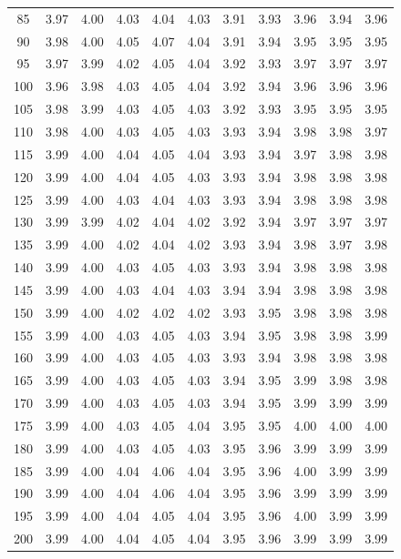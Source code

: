 \documentclass[preprint,12pt]{elsarticle}
\begin{document}
\begin{table}[ht]
\begin{tabular}{c|ccccc|ccccc}
  85 & 3.97 & 4.00 & 4.03 & 4.04 & 4.03 & 3.91 & 3.93 & 3.96 & 3.94 & 3.96 \\ 
  90 & 3.98 & 4.00 & 4.05 & 4.07 & 4.04 & 3.91 & 3.94 & 3.95 & 3.95 & 3.95 \\ 
  95 & 3.97 & 3.99 & 4.02 & 4.05 & 4.04 & 3.92 & 3.93 & 3.97 & 3.97 & 3.97 \\ 
  100 & 3.96 & 3.98 & 4.03 & 4.05 & 4.04 & 3.92 & 3.94 & 3.96 & 3.96 & 3.96 \\ 
  105 & 3.98 & 3.99 & 4.03 & 4.05 & 4.03 & 3.92 & 3.93 & 3.95 & 3.95 & 3.95 \\ 
  110 & 3.98 & 4.00 & 4.03 & 4.05 & 4.03 & 3.93 & 3.94 & 3.98 & 3.98 & 3.97 \\ 
  115 & 3.99 & 4.00 & 4.04 & 4.05 & 4.04 & 3.93 & 3.94 & 3.97 & 3.98 & 3.98 \\ 
  120 & 3.99 & 4.00 & 4.04 & 4.05 & 4.03 & 3.93 & 3.94 & 3.98 & 3.98 & 3.98 \\ 
  125 & 3.99 & 4.00 & 4.03 & 4.04 & 4.03 & 3.93 & 3.94 & 3.98 & 3.98 & 3.98 \\ 
  130 & 3.99 & 3.99 & 4.02 & 4.04 & 4.02 & 3.92 & 3.94 & 3.97 & 3.97 & 3.97 \\ 
  135 & 3.99 & 4.00 & 4.02 & 4.04 & 4.02 & 3.93 & 3.94 & 3.98 & 3.97 & 3.98 \\ 
  140 & 3.99 & 4.00 & 4.03 & 4.05 & 4.03 & 3.93 & 3.94 & 3.98 & 3.98 & 3.98 \\ 
  145 & 3.99 & 4.00 & 4.03 & 4.04 & 4.03 & 3.94 & 3.94 & 3.98 & 3.98 & 3.98 \\ 
  150 & 3.99 & 4.00 & 4.02 & 4.02 & 4.02 & 3.93 & 3.95 & 3.98 & 3.98 & 3.98 \\ 
  155 & 3.99 & 4.00 & 4.03 & 4.05 & 4.03 & 3.94 & 3.95 & 3.98 & 3.98 & 3.99 \\ 
  160 & 3.99 & 4.00 & 4.03 & 4.05 & 4.03 & 3.93 & 3.94 & 3.98 & 3.98 & 3.98 \\ 
  165 & 3.99 & 4.00 & 4.03 & 4.05 & 4.03 & 3.94 & 3.95 & 3.99 & 3.98 & 3.98 \\ 
  170 & 3.99 & 4.00 & 4.03 & 4.05 & 4.03 & 3.94 & 3.95 & 3.99 & 3.99 & 3.99 \\ 
  175 & 3.99 & 4.00 & 4.03 & 4.05 & 4.04 & 3.95 & 3.95 & 4.00 & 4.00 & 4.00 \\ 
  180 & 3.99 & 4.00 & 4.03 & 4.05 & 4.03 & 3.95 & 3.96 & 3.99 & 3.99 & 3.99 \\ 
  185 & 3.99 & 4.00 & 4.04 & 4.06 & 4.04 & 3.95 & 3.96 & 4.00 & 3.99 & 3.99 \\ 
  190 & 3.99 & 4.00 & 4.04 & 4.06 & 4.04 & 3.95 & 3.96 & 3.99 & 3.99 & 3.99 \\ 
  195 & 3.99 & 4.00 & 4.04 & 4.05 & 4.04 & 3.95 & 3.96 & 4.00 & 3.99 & 3.99 \\ 
  200 & 3.99 & 4.00 & 4.04 & 4.05 & 4.04 & 3.95 & 3.96 & 3.99 & 3.99 & 3.99 \\ 
   \hline
\end{tabular}
\end{table}
\end{document}
